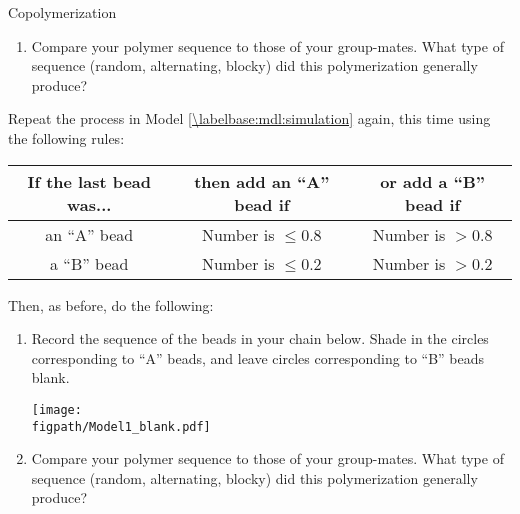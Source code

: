 \begin{activity}{Copolymerization}
\begin{ctqs}
\begin{enumerate}
			\item Compare your polymer sequence to those of your group-mates.  What type of sequence (random, alternating, blocky) did this polymerization generally produce?
			
				\begin{solution}[1.25in]\end{solution}
				
		\end{enumerate}
		
		\question \label{\labelbase:ctq:sim-blocky} Repeat the process in Model \ref{\labelbase:mdl:simulation} again, this time using the following rules:	\begin{center}
					\renewcommand{\arraystretch}{1.5}
					\begin{tabular}{|c|c|c|}
						\hline
						\textbf{If the last bead was...} &  \textbf{then add an ``A'' bead if} & \textbf{or add a ``B'' bead if}\\\hline
						 an ``A'' bead & Number is $\leq 0.8$ & Number is $> 0.8$ \\\hline
						 a ``B'' bead & Number is $\leq 0.2$ & Number is $> 0.2$ \\\hline
					\end{tabular}
					\end{center}
	
		Then, as before, do the following:
		\begin{enumerate}
			\item Record the sequence of the beads in your chain below.  Shade in the circles corresponding to ``A'' beads, and leave circles corresponding to ``B'' beads blank.
	
		\vspace{6pt}
		\centerline{\texttt{[image: \\figpath/Model1\_blank.pdf]}}
		
			\item Compare your polymer sequence to those of your group-mates.  What type of sequence (random, alternating, blocky) did this polymerization generally produce?
			
				\begin{solution}[1.5in]
\end{solution}
\end{enumerate}
\end{ctqs}
\end{activity}
